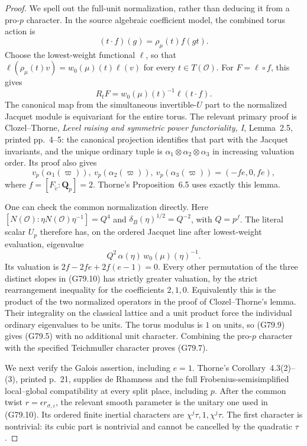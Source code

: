 \begin{proof}
We spell out the full-unit normalization, rather than
deducing it from a pro-\(p\) character.
In the source algebraic coefficient model, the combined
torus action is
\[
                (t\cdot f)(g)=\rho_\mu(t)f(gt).
\]
Choose the lowest-weight functional \(\ell\), so that
\(\ell(\rho_\mu(t)v)=w_0(\mu)(t)\ell(v)\) for every
\(t\in T(\mathcal O)\).
For \(F=\ell\circ f\), this gives
\[
        R_tF=w_0(\mu)(t)^{-1}\ell(t\cdot f).
 \tag{G79.9}
\]
The canonical map from the simultaneous invertible-\(U\)
part to the normalized Jacquet module is equivariant for
the entire torus.  The relevant primary proof is
Clozel--Thorne, \emph{Level raising and symmetric power
functoriality, I}, Lemma~2.5, printed pp.~4--5:
the canonical projection identifies that part with the
Jacquet invariants, and the unique ordinary tuple is
\(\alpha_1\otimes\alpha_2\otimes\alpha_3\) in increasing
valuation order.  Its proof also gives
\[
 v_p(\alpha_1(\varpi)),\
 v_p(\alpha_2(\varpi)),\
 v_p(\alpha_3(\varpi))
                  =(-fe,0,fe),                        \tag{G79.10}
\]
where \(f=[F_{\widetilde v}:\mathbf Q_p]=2\).
Thorne's Proposition~6.5 uses exactly this lemma.

One can check the common normalization directly.
Here \([N(\mathcal O):\eta N(\mathcal O)\eta^{-1}]=Q^4\)
and \(\delta_B(\eta)^{1/2}=Q^{-2}\), with \(Q=p^f\).
The literal scalar \(U_p\) therefore has, on the ordered
Jacquet line after lowest-weight evaluation, eigenvalue
\[
          Q^2\,\alpha(\eta)\,w_0(\mu)(\eta)^{-1}.
\]
Its valuation is
\(2f-2fe+2f(e-1)=0\).
Every other permutation of the three distinct slopes in
(G79.10) has strictly greater valuation, by the strict
rearrangement inequality for the coefficients \(2,1,0\).
Equivalently this is the product of the two normalized
operators in the proof of Clozel--Thorne's lemma.
Their integrality on the classical lattice and a unit
product force the individual ordinary eigenvalues to be
units.  The torus modulus is \(1\) on units, so (G79.9)
gives (G79.5) with no additional unit character.
Combining the pro-\(p\) character with the specified
Teichmuller character proves (G79.7).

We next verify the Galois assertion, including \(e=1\).
Thorne's Corollary~4.3(2)--(3), printed p.~21, supplies de
Rhamness and the full Frobenius-semisimplified local--global
compatibility at every split place, including \(p\).
After the common twist \(r=\epsilon r_{\sigma,\iota}\),
the relevant smooth parameter is the unitary one used in
(G79.10).  Its ordered finite inertial characters are
\(\chi^j\tau,1,\chi^j\tau\).
The first character is nontrivial: its cubic part is
nontrivial and cannot be cancelled by the quadratic \(\tau\).


\end{proof}
